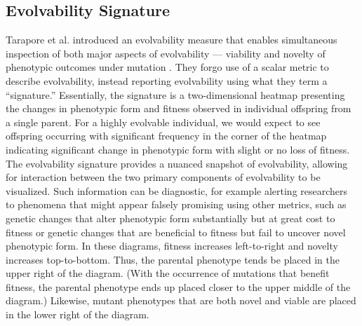 \subsection{Evolvability Signature}
Tarapore et al. introduced an evolvability measure that enables simultaneous inspection of both major aspects of evolvability --- viability and novelty of phenotypic outcomes under mutation \cite{tarapore2015evolvability}.
They forgo use of a scalar metric to describe evolvability, instead reporting evolvability using what they term a ``signature.''
Essentially, the signature is a two-dimensional heatmap presenting the changes in phenotypic form and fitness observed in individual offspring from a single parent.
For a highly evolvable individual, we would expect to see offspring occurring with significant frequency in the corner of the heatmap indicating significant change in phenotypic form with slight or no loss of fitness.
The evolvability signature provides a nuanced snapshot of evolvability, allowing for interaction between the two primary components of evolvability to be visualized.
Such information can be diagnostic, for example alerting researchers to phenomena that might appear falsely promising using other metrics, such as genetic changes that alter phenotypic form substantially but at great cost to fitness or genetic changes that are beneficial to fitness but fail to uncover novel phenotypic form.
In these diagrams, fitness increases left-to-right and novelty increases top-to-bottom.
Thus, the parental phenotype tends be placed in the upper right of the diagram.
(With the occurrence of mutations that benefit fitness, the parental phenotype ends up placed closer to the upper middle of the diagram.)
Likewise, mutant phenotypes that are both novel and viable are placed in the lower right of the diagram.
